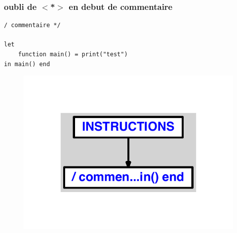 \documentclass{article}
\begin{document}
\subsubsection{oubli de $ < $*$ > $ en debut de commentaire}
\begin{lstlisting}
/ commentaire */

let
	function main() = print("test")
in main() end
\end{lstlisting}
\newpage
\begin{figure}[H]
\centering
\includegraphics[max width=\textwidth]{ast/ast_145.pdf}
\end{figure}
\newpage
\end{document}
